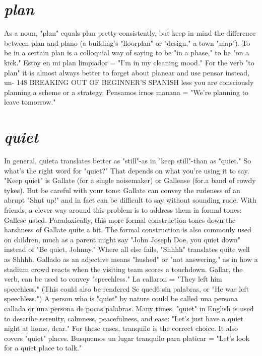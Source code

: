 \documentclass[14pt,a4paper,oneside]{memoir}
\begin{document}
\section{\emph{plan}}

As a noun, "plan" equals plan pretty consistently, but keep in
mind the difference between plan and plano (a building's "floorplan"
or "design," a town "map"). To be in a certain plan is a colloquial way
of saying to be "in a phase," to be "on a kick." Estoy en mi plan limpiador = "I'm in my cleaning mood." For the verb "to plan" it is almost always better to forget about planear and use pensar instead, un-
148 BREAKING OUT OF BEGINNER'S SPANISH
less you are consciously planning a scheme or a strategy. Pensamos
irnos manana = "We're planning to leave tomorrow."

\section{\emph{quiet}}

In general, quieta translates better as "still"-as in "keep
still"-than as "quiet." So what's the right word for "quiet?" That
depends on what you're using it to say. "Keep quiet" is Gallate (for
a single noisemaker) or Gallense (for.a band of rowdy tykes). But be
careful with your tone: Gallate can convey the rudeness of an abrupt
"Shut up!" and in fact can be difficult to say without sounding rude.
With friends, a clever way around this problem is to address them in
formal tones: Gallese usted. Paradoxically, this more formal construction tones down the harshness of Gallate quite a bit. The formal construction is also commonly used on children, much as a parent might
say "John Joseph Doe, you quiet down" instead of "Be quiet, Johnny."
Where all else fails, "Shhhh" translates quite well as Shhhh.
Gallado as an adjective means "hushed" or "not answering,"
as in how a stadium crowd reacts when the visiting team scores a
touchdown. Gallar, the verb, can be used to convey "speechless." La
callaron = "They left him speechless." (This could also be rendered
Se qued6 sin palabras, or "He was left speechless.") A person who is
"quiet" by nature could be called una persona callada or una persona
de pocas palabras.
Many times, "quiet" in English is used to describe serenity,
calmness, peacefulness, and ease: "Let's just have a quiet night at
home, dear." For these cases, tranquilo is the correct choice. It also
covers "quiet" places. Busquemos un lugar tranquilo para platicar =
"Let's look for a quiet place to talk."
\end{document}
